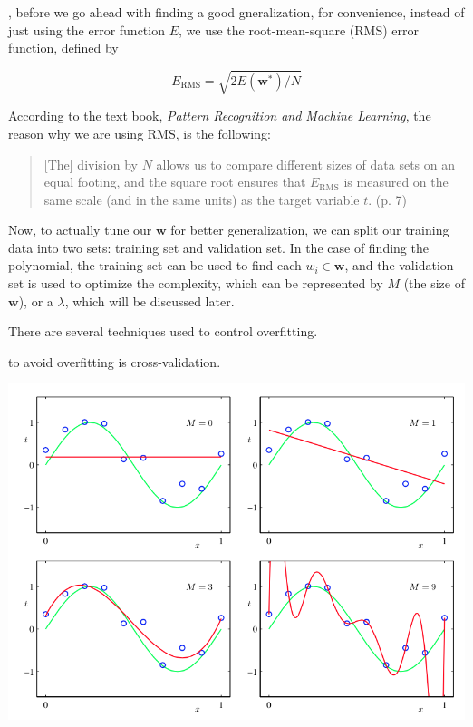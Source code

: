 \documentclass{tufte-handout}
\begin{document}
, before we go ahead with finding a good gneralization,
for convenience, instead of just using the error function $E$, we use the
root-mean-square (RMS) error function, defined by

\begin{equation}
  E_{\text{RMS}} = \sqrt{2E(\mathbf{w}^*)/N}
\end{equation}

According to the text book, \textit{Pattern Recognition and Machine Learning},
the reason why we are using RMS, is the following:

\begin{quote}
  [The] division by $N$ allows us to compare different sizes of data sets
  on an equal footing, and the square root ensures that $E_{\text{RMS}}$ is
  measured on the same scale (and in the same units) as the target variable $t$.
  (p. 7)
\end{quote}

Now, to actually tune our $\mathbf{w}$ for better generalization, we can split
our training data into two sets: training set and validation set. In the case of
finding the polynomial, the training set can be used to find each $w_i \in
\mathbf{w}$, and the validation set is used to optimize the complexity, which
can be represented by $M$ (the size of $\mathbf{w}$), or a $\lambda$, which
will be discussed later.

There are several techniques used to control overfitting.

 to avoid overfitting is cross-validation.

\begin{marginfigure}
  \includegraphics[width=\linewidth]{oscillations.png}
  \caption{Visually, we see that the oscillation increases as $M$ increases.}
\end{marginfigure}
\end{document}
